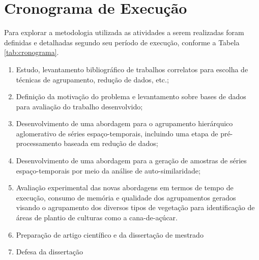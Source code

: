 \section{Cronograma de Execução}
	\label{sec:cronograma}

Para explorar a metodologia utilizada as atividades a serem realizadas foram
definidas e detalhadas segundo seu período de execução, conforme a Tabela
\ref{tab:cronograma}.

\begin{enumerate}

\item Estudo, levantamento bibliográfico de trabalhos correlatos para escolha de
técnicas de agrupamento, redução de dados, etc.;

\item Definição da motivação do problema e levantamento sobre bases de dados
para avaliação do trabalho desenvolvido;

\item Desenvolvimento de uma abordagem para o agrupamento hierárquico
aglomerativo de séries espaço-temporais, incluindo uma etapa de
pré-processamento baseada em redução de dados;

\item Desenvolvimento de uma abordagem para a geração de amostras de séries
espaço-temporais por meio da análise de auto-similaridade;

\item Avaliação experimental das novas abordagens em termos de tempo de
execução, consumo de memória e qualidade dos agrupamentos gerados visando o
agrupamento dos diversos tipos de vegetação para identificação de áreas de
plantio de culturas como a cana-de-açúcar.

\item Preparação de artigo científico e da dissertação de mestrado

\item Defesa da dissertação

\end{enumerate}  


